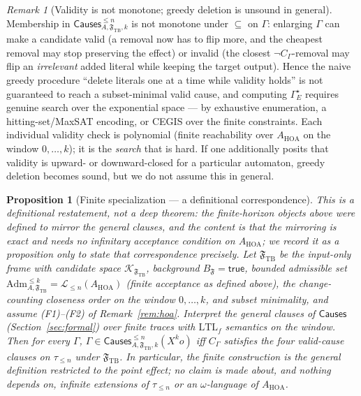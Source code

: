 \documentclass[11pt]{article}
\newtheorem{proposition}{Proposition}
\theoremstyle{remark}
\newtheorem{remark}{Remark}
\newcommand{\LTL}{\mathrm{LTL}}
\newcommand{\Lang}{\mathcal{L}}
\newcommand{\True}{\mathsf{true}}
\newcommand{\Frame}{\mathfrak{F}}
\newcommand{\Adm}{\mathrm{Adm}}
\begin{document}
\begin{remark}[Validity is not monotone; greedy deletion is unsound in general]
\label{rem:nonmonotone}
Membership in \(\mathsf{Causes}^{\le n}_{A,\Frame_{\mathrm{TB}},k}\) is not
monotone under \(\subseteq\) on \(\Gamma\): enlarging \(\Gamma\) can make a
candidate valid (a removal now has to flip more, and the cheapest removal may stop
preserving the effect) or invalid (the closest \(\neg C_\Gamma\)-removal may flip
an \emph{irrelevant} added literal while keeping the target output). Hence the
naive greedy procedure ``delete literals one at a time while validity holds'' is
not guaranteed to reach a subset-minimal valid cause, and computing
\(\Gamma_E^\star\) requires genuine search over the exponential space --- by
exhaustive enumeration, a hitting-set/MaxSAT encoding, or CEGIS over the finite
constraints. Each individual validity check is polynomial (finite reachability
over \(A_{\mathrm{HOA}}\) on the window \(0,\ldots,k\)); it is the \emph{search}
that is hard. If one additionally posits that validity is upward- or
downward-closed for a particular automaton, greedy deletion becomes sound, but we
do not assume this in general.
\end{remark}

\begin{proposition}[Finite specialization --- a definitional correspondence]
\label{prop:tb-reduction}
This is a \emph{definitional} restatement, not a deep theorem: the finite-horizon
objects above were \emph{defined} to mirror the general clauses, and the content is
that the mirroring is exact and needs no infinitary acceptance condition on
\(A_{\mathrm{HOA}}\); we record it as a proposition only to state that
correspondence precisely. Let
\(\Frame_{\mathrm{TB}}\) be the input-only frame with candidate space
\(\mathcal{K}_{\Frame_{\mathrm{TB}}}\), background \(B_{\Frame}=\True\), bounded
admissible set \(\Adm^{\le k}_{A,\Frame_{\mathrm{TB}}}=\Lang_{\le n}(A_{\mathrm{HOA}})\)
(finite acceptance as defined above), the change-counting closeness order on the
window \(0,\ldots,k\), and subset minimality, and assume (F1)--(F2) of
Remark~\ref{rem:hoa}. Interpret the general clauses of \(\mathsf{Causes}\)
(Section~\ref{sec:formal}) over finite traces with \(\LTL_f\) semantics on the
window. Then for every \(\Gamma\),
\(\Gamma\in\mathsf{Causes}^{\le n}_{A,\Frame_{\mathrm{TB}},k}(X^k o)\) iff
\(C_\Gamma\) satisfies the four valid-cause clauses on \(\tau_{\le n}\) under
\(\Frame_{\mathrm{TB}}\). In particular, the finite construction \emph{is} the
general definition restricted to the point effect; no claim is made about, and
nothing depends on, infinite extensions of \(\tau_{\le n}\) or an
\(\omega\)-language of \(A_{\mathrm{HOA}}\).
\end{proposition}
\end{document}
